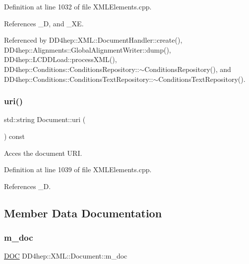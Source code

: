Definition at line 1032 of file X\+M\+L\+Elements.\+cpp.



References \+\_\+D, and \+\_\+\+XE.



Referenced by D\+D4hep\+::\+X\+M\+L\+::\+Document\+Handler\+::create(), D\+D4hep\+::\+Alignments\+::\+Global\+Alignment\+Writer\+::dump(), D\+D4hep\+::\+L\+C\+D\+D\+Load\+::process\+X\+M\+L(), D\+D4hep\+::\+Conditions\+::\+Conditions\+Repository\+::$\sim$\+Conditions\+Repository(), and D\+D4hep\+::\+Conditions\+::\+Conditions\+Text\+Repository\+::$\sim$\+Conditions\+Text\+Repository().

\hypertarget{class_d_d4hep_1_1_x_m_l_1_1_document_a007b7a2db1441bca8f591f97d9ad2647}{}\label{class_d_d4hep_1_1_x_m_l_1_1_document_a007b7a2db1441bca8f591f97d9ad2647} 
\subsubsection{\texorpdfstring{uri()}{uri()}}
{\footnotesize\ttfamily std\+::string Document\+::uri (\begin{DoxyParamCaption}{ }\end{DoxyParamCaption}) const}



Acces the document U\+RI. 



Definition at line 1039 of file X\+M\+L\+Elements.\+cpp.



References \+\_\+D.



\subsection{Member Data Documentation}
\hypertarget{class_d_d4hep_1_1_x_m_l_1_1_document_a8fad6eeaaafe3a15002cb16fb0b325a3}{}\label{class_d_d4hep_1_1_x_m_l_1_1_document_a8fad6eeaaafe3a15002cb16fb0b325a3} 
\subsubsection{\texorpdfstring{m\+\_\+doc}{m\_doc}}
{\footnotesize\ttfamily \hyperlink{class_d_d4hep_1_1_x_m_l_1_1_document_a685ff83de83e9b7b37e79ad846fc2387}{D\+OC} D\+D4hep\+::\+X\+M\+L\+::\+Document\+::m\+\_\+doc}



